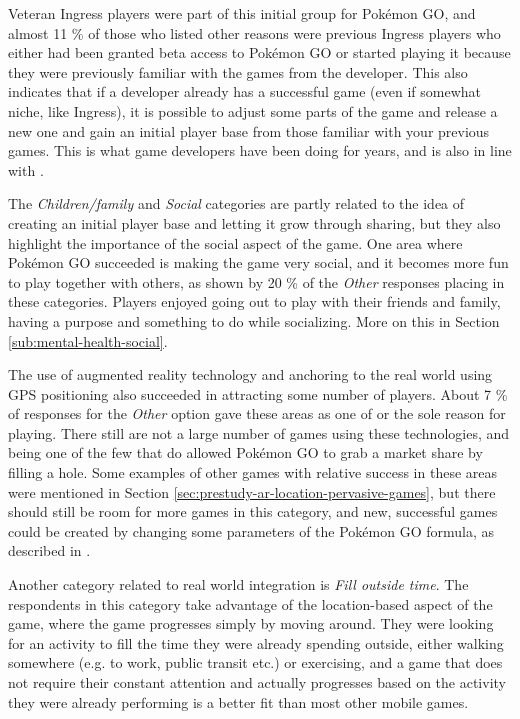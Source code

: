 Veteran Ingress players were part of this initial group for Pokémon GO, and almost 11 \% of those who listed other reasons were previous Ingress players who either had been granted beta access to Pokémon GO or started playing it because they were previously familiar with the games from the developer. This also indicates that if a developer already has a successful game (even if somewhat niche, like Ingress), it is possible to adjust some parts of the game and release a new one and gain an initial player base from those familiar with your previous games. This is what game developers have been doing for years, and is also in line with .

The \emph{Children/family} and \emph{Social} categories are partly related to the idea of creating an initial player base and letting it grow through sharing, but they also highlight the importance of the social aspect of the game. One area where Pokémon GO succeeded is making the game very social, and it becomes more fun to play together with others, as shown by 20 \% of the \emph{Other} responses placing in these categories. Players enjoyed going out to play with their friends and family, having a purpose and something to do while socializing. More on this in Section \ref{sub:mental-health-social}. 

The use of augmented reality technology and anchoring to the real world using GPS positioning also succeeded in attracting some number of players. About 7 \% of responses for the \emph{Other} option gave these areas as one of or the sole reason for playing. There still are not a large number of games using these technologies, and being one of the few that do allowed Pokémon GO to grab a market share by filling a hole. Some examples of other games with relative success in these areas were mentioned in Section \ref{sec:prestudy-ar-location-pervasive-games}, but there should still be room for more games in this category, and new, successful games could be created by changing some parameters of the Pokémon GO formula, as described in .

Another category related to real world integration is \emph{Fill outside time}. The respondents in this category take advantage of the location-based aspect of the game, where the game progresses simply by moving around. They were looking for an activity to fill the time they were already spending outside, either walking somewhere (e.g. to work, public transit etc.) or exercising, and a game that does not require their constant attention and actually progresses based on the activity they were already performing is a better fit than most other mobile games.

